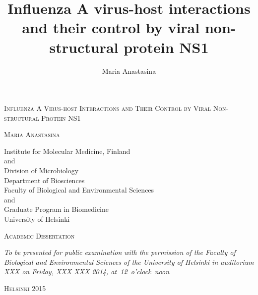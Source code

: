 \documentclass[a4paper,12pt]{article} %
\title{Influenza A virus-host interactions \\ and their control by viral non-structural protein NS1}
\author{Maria Anastasina}
\begin{document}

\begin{titlepage}
	\begin{center}
		
		\vspace*{1.5 cm}	
	
		\LARGE \textsc{Influenza A Virus-host Interactions and Their Control by Viral Non-structural Protein NS1}
		
		\vspace{2 cm}
		
		\Large \textsc{Maria Anastasina}
		
		\vspace{2 cm}
		
		\large Institute for Molecular Medicine, Finland \\
		and\\
		Division of Microbiology \\
		Department of Biosciences \\
		Faculty of Biological and Environmental Sciences\\
		and\\
		Graduate Program in Biomedicine\\
		University of Helsinki
		
		\vspace{2.5 cm}
		
		\large \textsc{Academic Dissertation}
		
		\vspace{1 cm}		
		
		\textit{To be presented for public examination with the permission of the Faculty of Biological and Environmental Sciences of the University of Helsinki in auditorium XXX on Friday, XXX XXX 2014, at~12~o'clock~noon}
		
		\vspace{1.5 cm}
		\large \textsc{Helsinki 2015}
	\end{center}
\end{titlepage}

\newpage
\thispagestyle{empty}
\end{document}
